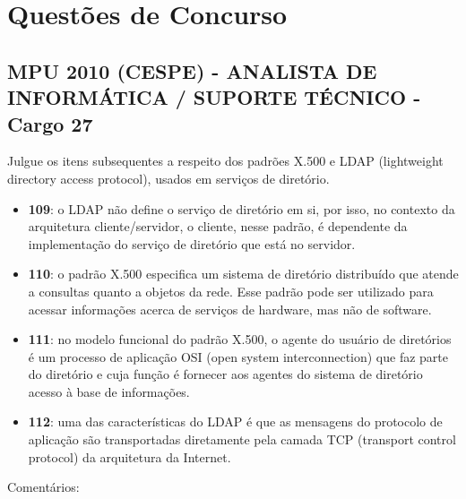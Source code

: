 \newpage \chapter{Questões de Concurso}\setcounter{SteP}{1}

\section{MPU 2010 (CESPE) - ANALISTA DE INFORMÁTICA / SUPORTE TÉCNICO -
Cargo 27}\setcounter{SteP}{1}

    Julgue os itens subsequentes a respeito dos padrões X.500 e LDAP
(lightweight directory access protocol), usados em serviços de
diretório.

\begin{itemize}
\item{\bf }{\bf 109}: o LDAP não define o serviço de diretório em si, por isso,
no contexto da arquitetura cliente/servidor, o cliente, nesse padrão, é
dependente da implementação do serviço de diretório que está no servidor.

\item{\bf }{\bf 110}: o padrão X.500 especifica um sistema de diretório
distribuído que atende a consultas quanto a objetos da rede. Esse padrão
pode ser utilizado para acessar informações acerca de serviços de hardware,
mas não de software.

\item{\bf }{\bf 111}: no modelo funcional do padrão X.500, o agente do usuário
de diretórios é um processo de aplicação OSI (open system interconnection)
que faz parte do diretório e cuja função é fornecer aos agentes do sistema
de diretório acesso à base de informações.

\item{\bf }{\bf 112}: uma das características do LDAP é que as mensagens do
protocolo de aplicação são transportadas diretamente pela camada TCP
(transport control protocol) da arquitetura da Internet.
\end{itemize}

    Comentários:

